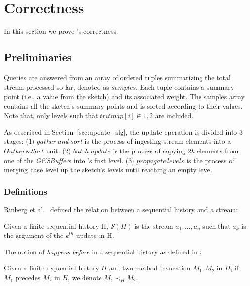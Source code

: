 \chapter{Correctness}
\label{chap:correctness}


In this section we prove \mysketch's correctness. 

\section{Preliminaries}

Queries are answered from an array of ordered tuples summarizing the total stream processed so far, denoted as $\mathit{samples}$. Each tuple contains a summary point (i.e., a value from the sketch) and its associated weight. The samples array contains all the sketch's summary points and is sorted according to their values. Note that, only levels such that $\mathit{tritmap}[i]\in{1,2}$ are included.

As described in Section~\ref{sec:update_alg}, the update operation is divided into 3 stages: 
(1) $\mathit{gather\ and\ sort}$ is the process of ingesting stream elements into a $\mathit{Gather\&Sort}$ unit.
(2) $\mathit{batch\ update}$ is the process of copying $2k$ elements from one of the \emph{G\&SBuffer}s into \mysketch's first level. 
(3) $\mathit{propagate\ levels}$ is the process of merging base level up the sketch's levels until reaching an empty level. 





\subsection{Definitions}

Rinberg et al.~\cite{Rinberg_2020_fast_sketches} defined the relation between a sequential history and a stream:
\begin{definition} 
Given a finite sequential history H, $\mathcal{S}(H)$ is the stream $a_1,\dots,a_n$ such that $a_k$ is the argument of the $k^{th}$ update in H.
\end{definition}


The notion of \emph{happens before} in a sequential history as defined in \cite{Rinberg_2020_fast_sketches}:
\begin{definition}
Given a finite sequential history $\mathit{H}$ and two method invocation $M_1,M_2$ in $\mathit{H}$, if $M_1$ precedes $M_2$ in $\mathit{H}$, we denote $M_1 \prec_H M_2$.
\end{definition}

